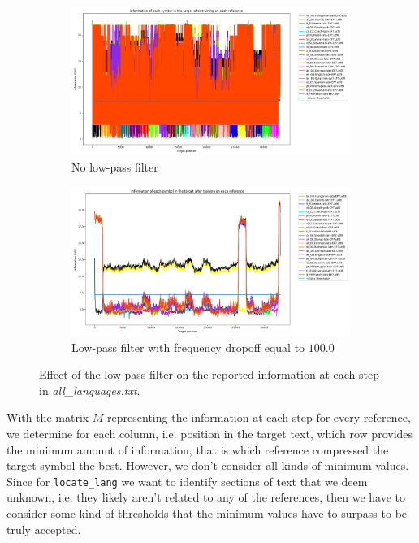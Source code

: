 \documentclass{article}
\begin{document}
\begin{figure}
    \centering
    \begin{subfigure}[b]{0.4\textwidth}
        \centering
        \includegraphics[width=\textwidth]{./images/no_freq_dropoff.png}
        \caption{No low-pass filter}
        \label{fig:no_freq_dropoff}
    \end{subfigure}
    \hfill
    \begin{subfigure}[b]{0.4\textwidth}
        \centering
        \includegraphics[width=\textwidth]{./images/freq_dropoff.png}
        \caption{Low-pass filter with frequency dropoff equal to $100.0$}
        \label{fig:freq_dropoff}
    \end{subfigure}
    \caption{Effect of the low-pass filter on the reported information at each step in \textit{all\_languages.txt}.}
    \label{fig:low_pass_filter_res}
\end{figure}

With the matrix $M$ representing the information at each step for every reference, we determine for each column, i.e. position in the target text, which row provides the minimum amount of information, that is which reference compressed the target symbol the best.
However, we don't consider all kinds of minimum values.
Since for \texttt{locate_lang} we want to identify sections of text that we deem unknown, i.e. they likely aren't related to any of the references, then we have to consider some kind of thresholds that the minimum values have to surpass to be truly accepted.
\end{document}
